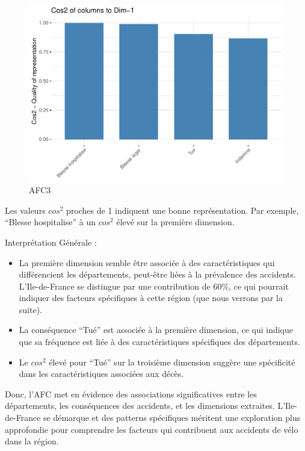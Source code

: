 \documentclass[french,]{compterendu}
\theoremstyle{urcastyle}
\theoremstyle{remark}
\begin{document}
\begin{figure}[H]

{\centering \includegraphics[width=0.9\linewidth]{Rapport_ADD_LEO-GABET_files/figure-latex/afc3-1} 

}

\caption{AFC3}\label{fig:afc3}
\end{figure}

Les valeurs \(cos^2\) proches de 1 indiquent une bonne représentation. Par exemple, ``Blesse hospitalise'' à un \(cos^2\) élevé sur la première dimension.

Interprétation Générale :

\begin{itemize}
\item
  La première dimension semble être associée à des caractéristiques qui différencient les départements, peut-être liées à la prévalence des accidents. L'Ile-de-France se distingue par une contribution de 60\%, ce qui pourrait indiquer des facteurs spécifiques à cette région (que nous verrons par la suite).
\item
  La conséquence ``Tué'' est associée à la première dimension, ce qui indique que sa fréquence est liée à des caractéristiques spécifiques des départements.
\item
  Le \(cos^2\) élevé pour ``Tué'' sur la troisième dimension suggère une spécificité dans les caractéristiques associées aux décès.
\end{itemize}

Donc, l'AFC met en évidence des associations significatives entre les départements, les conséquences des accidents, et les dimensions extraites. L'Ile-de-France se démarque et des patterns spécifiques méritent une exploration plus approfondie pour comprendre les facteurs qui contribuent aux accidents de vélo dans la région.
\end{document}
